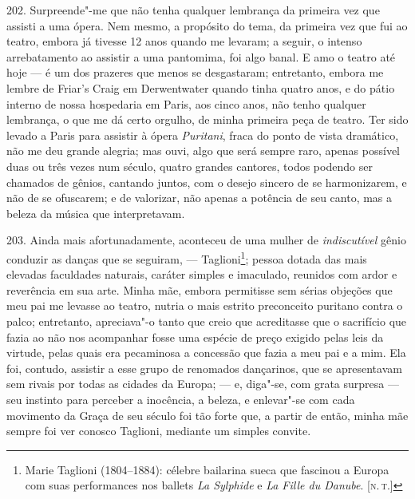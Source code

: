 202. Surpreende"-me que não tenha qualquer lembrança da primeira vez que
assisti a uma ópera. Nem mesmo, a propósito do tema, da primeira vez que
fui ao teatro, embora já tivesse 12 anos quando me levaram; a seguir, o
intenso arrebatamento ao assistir a uma pantomima, foi algo banal. E amo
o teatro até hoje --- é um dos prazeres que menos se desgastaram;
entretanto, embora me lembre de Friar's Craig em Derwentwater quando
tinha quatro anos, e do pátio interno de nossa hospedaria em Paris, aos
cinco anos, não tenho qualquer lembrança, o que me dá certo orgulho, de
minha primeira peça de teatro. Ter sido levado a Paris para assistir à
ópera \emph{Puritani}, fraca do ponto de vista dramático, não me deu
grande alegria; mas ouvi, algo que será sempre raro, apenas possível
duas ou três vezes num século, quatro grandes cantores, todos podendo
ser chamados de gênios, cantando juntos, com o desejo sincero de se
harmonizarem, e não de se ofuscarem; e de valorizar, não apenas a
potência de seu canto, mas a beleza da música que interpretavam.

203. Ainda mais afortunadamente, aconteceu de uma mulher de
\emph{indiscutível} gênio conduzir as danças que se seguiram, ---
Taglioni\footnote{Marie Taglioni (1804--1884): célebre bailarina sueca
  que fascinou a Europa com suas performances nos ballets \emph{La
  Sylphide} e \emph{La Fille du Danube}. {[}\textsc{n.\,t.}{]}}; pessoa dotada
das mais elevadas faculdades naturais, caráter simples e imaculado,
reunidos com ardor e reverência em sua arte. Minha mãe, embora
permitisse sem sérias objeções que meu pai me levasse ao teatro, nutria
o mais estrito preconceito puritano contra o palco; entretanto,
apreciava"-o tanto que creio que acreditasse que o sacrifício que fazia
ao não nos acompanhar fosse uma espécie de preço exigido pelas leis da
virtude, pelas quais era pecaminosa a concessão que fazia a meu pai e a
mim. Ela foi, contudo, assistir a esse grupo de renomados dançarinos,
que se apresentavam sem rivais por todas as cidades da Europa; --- e,
diga"-se, com grata surpresa --- seu instinto para perceber a inocência, a
beleza, e enlevar"-se com cada movimento da Graça de seu século foi tão
forte que, a partir de então, minha mãe sempre foi ver conosco Taglioni,
mediante um simples convite.


